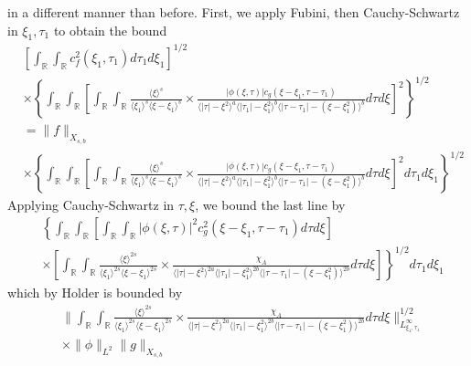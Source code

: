 \documentclass[12pt,reqno]{amsart}
\numberwithin{equation}{section}  %
\numberwithin{figure}{section}
\newcommand{\rr}{\mathbb{R}}
\theoremstyle{plain}
\theoremstyle{definition}
\theoremstyle{remark}
\begin{document}
in a different manner than before. First, we apply 
Fubini, then Cauchy-Schwartz in $\xi_{1}, \tau_{1}$ to obtain the bound
%
%
\begin{equation*}
\begin{split}
  & \left[ \int_{\rr} \int_{\rr} c_{f}^{2}(\xi_{1}, \tau_{1}) d \tau_{1} d
  \xi_{1} \right]^{1/2}
  \\
  & \times \left \{ \int_{\rr} \int_{\rr}   
 \left[
  \int_{\rr} \int_{\rr}
   \frac{\langle \xi \rangle ^{s}}{\langle \xi_{1} \rangle ^{s} \langle
   \xi - \xi_{1}\rangle ^{s}} \times \frac{|\phi(\xi, \tau)| c_{g}(\xi -
   \xi_{1}, \tau - \tau_{1})
}{\langle | \tau | - \xi^{2} \rangle
  ^{a} \langle | \tau_{1} | - \xi_{1}^{2} \rangle ^{b} \langle | \tau -
  \tau_{1} | - (\xi - \xi_{1}^{2}) \rangle ^{b}} d \tau d \xi 
  \right]^{2} \right \}^{1/2}
  \\
  & = \| f \|_{X_{s,b}}
  \\
  & \times \left \{ \int_{\rr} \int_{\rr}   
 \left[
  \int_{\rr} \int_{\rr}
   \frac{\langle \xi \rangle ^{s}}{\langle \xi_{1} \rangle ^{s} \langle
   \xi - \xi_{1}\rangle ^{s}} \times \frac{|\phi(\xi, \tau)| c_{g}(\xi -
   \xi_{1}, \tau - \tau_{1})
}{\langle | \tau | - \xi^{2} \rangle
  ^{a} \langle | \tau_{1} | - \xi_{1}^{2} \rangle ^{b} \langle | \tau -
  \tau_{1} | - (\xi - \xi_{1}^{2}) \rangle ^{b}} d \tau d \xi 
  \right]^{2} d \tau_{1} d \xi_{1} \right \}^{1/2}
\end{split}
\end{equation*}
%
Applying Cauchy-Schwartz in $\tau, \xi$, we bound the last line by 
%
%
\begin{equation*}
\begin{split}
& \left \{ \int_{\rr} \int_{\rr}   
  \left [ \int_{\rr} \int_{\rr}
  | \phi(\xi, \tau)|^{2} c_{g}^{2}(\xi - \xi_{1}, \tau - \tau_{1}) d \tau d \xi 
    \right ] \right . 
   \\
   & \left. \times \left [ \int_{\rr} \int_{\rr} \frac{\langle \xi \rangle
   ^{2s}}{\langle \xi_{1} \rangle ^{2s} \langle \xi - \xi_{1}\rangle ^{2s}}
   \times \frac{\chi_{A}}{\langle | \tau | - \xi^{2} \rangle ^{2a} \langle | \tau_{1} |
   - \xi_{1}^{2} \rangle ^{2b} \langle | \tau - \tau_{1} | - (\xi - \xi_{1}^{2})
   \rangle ^{2b}} d \tau d \xi \right ] \right \}^{1/2}d \tau_{1} d \xi_{1}
\end{split}
\end{equation*}
%
%
which by Holder is bounded by 
%
%
%
\begin{equation}
  \label{integral-bound-2nd-form}
\begin{split}
  & \| \int_{\rr} \int_{\rr} \frac{\langle \xi \rangle ^{2s}}{\langle \xi_{1} \rangle ^{2s} \langle
  \xi - \xi_{1}\rangle ^{2s}}  \times \frac{\chi_{A}}{\langle | \tau | - \xi^{2} \rangle
  ^{2a} \langle | \tau_{1} | - \xi_{1}^{2} \rangle ^{2b} \langle | \tau -
  \tau_{1} | - (\xi - \xi_{1}^{2}) \rangle ^{2b}} d \tau d \xi
  \|_{L^{\infty}_{\xi_{1}, \tau_{1}}}^{1/2}
  \\
  & \times \|\phi\|_{L^{2}} \| g \|_{X_{s,b}}
\end{split}
\end{equation}
\end{document}
